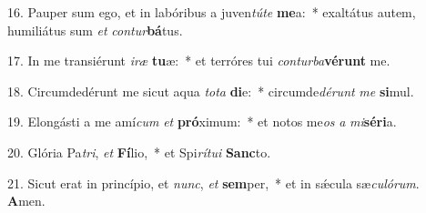 16. Pauper sum ego, et in labóribus a juven\textit{tú}\textit{te} \textbf{me}a:~*  exaltátus autem, humiliátus sum \textit{et} \textit{con}\textit{tur}\textbf{bá}tus.\

17. In me transiérunt \textit{i}\textit{ræ} \textbf{tu}æ:~*  et terróres tui \textit{con}\textit{tur}\textit{ba}\textbf{vé}\textbf{runt} me.\

18. Circumdedérunt me sicut aqua \textit{to}\textit{ta} \textbf{di}e:~*  circumde\textit{dé}\textit{runt} \textit{me} \textbf{si}mul.\

19. Elongásti a me amí\textit{cum} \textit{et} \textbf{pró}ximum:~*  et notos me\textit{os} \textit{a} \textit{mi}\textbf{sé}\textbf{ri}a.\

20. Glória Pa\textit{tri}, \textit{et} \textbf{Fí}lio,~*  et Spi\textit{rí}\textit{tu}\textit{i} \textbf{Sanc}to.\

21. Sicut erat in princípio, et \textit{nunc}, \textit{et} \textbf{sem}per,~*  et in sǽcula sæ\textit{cu}\textit{ló}\textit{rum}. \textbf{A}men.\

